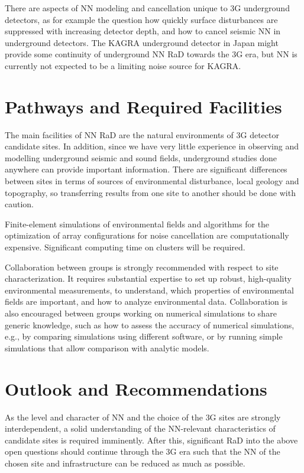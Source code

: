 There are aspects of \ac{NN} modeling and cancellation unique to \ac{3G} underground detectors, as for example the question how quickly surface disturbances are suppressed with increasing detector depth, and how to cancel seismic \ac{NN} in underground detectors. The \ac{KAGRA} underground detector in Japan might 
provide some continuity of underground \ac{NN} \ac{RaD} towards the \ac{3G} era, but \ac{NN} is currently not expected to be a limiting noise source for \ac{KAGRA}.

\section{Pathways and Required Facilities}
The main facilities of \ac{NN} \ac{RaD} are the natural environments of \ac{3G} detector candidate sites. In addition, since we have very little experience in observing and modelling underground seismic and sound fields, underground studies done anywhere can provide important information. There are significant differences between sites in terms of sources of environmental disturbance, local geology and topography, so transferring results from one site to another should be done with caution.

Finite-element simulations of environmental fields and algorithms for the optimization of array configurations for noise cancellation are computationally expensive. Significant computing time on clusters will be required. 

Collaboration between groups is strongly recommended with respect to site characterization. It requires substantial expertise to set up robust, high-quality environmental measurements, to understand, which properties of environmental fields are important, and how to analyze environmental data. Collaboration is also encouraged between groups working on numerical simulations to share generic knowledge, such as how to assess the accuracy of numerical simulations, e.g., by comparing simulations using different software, or by running simple simulations that allow comparison with analytic models.

\section{Outlook and Recommendations}

As the level and character of \ac{NN} and the choice of the \ac{3G} sites are strongly interdependent, a solid understanding of the \ac{NN}-relevant characteristics of candidate sites is required imminently. After this, significant \ac{RaD} into the above open questions should continue through the \ac{3G} era such that the \ac{NN} of the chosen site and infrastructure can be reduced as much as possible. 


